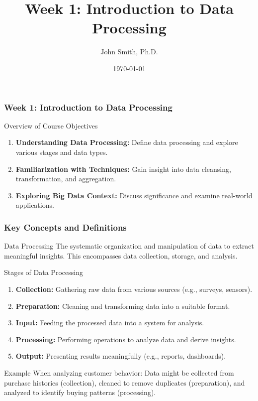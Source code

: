 \documentclass[aspectratio=169]{beamer}
\title[Week 1: Introduction to Data Processing]{Week 1: Introduction to Data Processing}
\subtitle{}
\author[J. Smith]{John Smith, Ph.D.}
\institute[University Name]{
  Department of Computer Science\\
  University Name\\
  \vspace{0.3cm}
  Email: email@university.edu\\
  Website: www.university.edu
}
\date{\today}
\begin{document}
\frame{\titlepage}

\begin{frame}[fragile]
    \frametitle{Week 1: Introduction to Data Processing}
    \begin{block}{Overview of Course Objectives}
        \begin{enumerate}
            \item \textbf{Understanding Data Processing:} Define data processing and explore various stages and data types.
            \item \textbf{Familiarization with Techniques:} Gain insight into data cleansing, transformation, and aggregation.
            \item \textbf{Exploring Big Data Context:} Discuss significance and examine real-world applications.
        \end{enumerate}
    \end{block}
\end{frame}

\begin{frame}[fragile]
    \frametitle{Key Concepts and Definitions}
    \begin{block}{Data Processing}
        The systematic organization and manipulation of data to extract meaningful insights. This encompasses data collection, storage, and analysis.
    \end{block}
    
    \begin{block}{Stages of Data Processing}
        \begin{enumerate}
            \item \textbf{Collection:} Gathering raw data from various sources (e.g., surveys, sensors).
            \item \textbf{Preparation:} Cleaning and transforming data into a suitable format.
            \item \textbf{Input:} Feeding the processed data into a system for analysis.
            \item \textbf{Processing:} Performing operations to analyze data and derive insights.
            \item \textbf{Output:} Presenting results meaningfully (e.g., reports, dashboards).
        \end{enumerate}
    \end{block}
    
    \begin{block}{Example}
        When analyzing customer behavior: Data might be collected from purchase histories (collection), cleaned to remove duplicates (preparation), and analyzed to identify buying patterns (processing).
    \end{block}
\end{frame}
\end{document}
